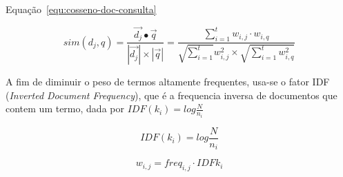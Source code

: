 \documentclass[10pt,a4paper]{article}
\begin{document}
 
 
 Equação~\ref{equ:cosseno-doc-consulta}	
 
\begin{equation}
sim(d_j, q) = \frac{ \vec{d_j} \bullet \vec{q} }
                   { |\vec{d_j}| \times | \vec{q}|}
            = \frac{ \sum_{i=1}^{t} w_{i,j} \cdot w_{i,q} }
                   { \sqrt{\sum_{i=1}^{t}} w_{i,j}^2 \times \sqrt{\sum_{i=1}^{t} w_{i,q}^2 } }                   \label{equ:cosseno-doc-consulta}		                   
\end{equation} 
 
 
 
A fim de diminuir o peso de termos altamente frequentes, usa-se o fator IDF (\textit{Inverted Document Frequency}), que é a frequencia inversa de documentos que contem um termo, dada por $IDF(k_i) = log\frac{N}{n_i}$ 
 
 
\begin{equation}
IDF(k_i) = log\frac{N}{n_i}
\label{equ:IDF}
\end{equation}


\begin{equation}
	w_{i,j} = freq_{i,j} \cdot IDF{k_i}
\end{equation}
 
\end{document}
